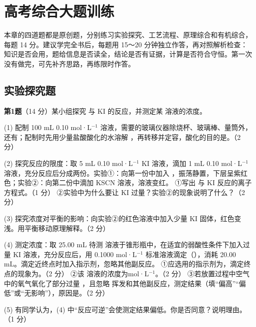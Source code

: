 \chapter{高考综合大题训练}

本章的四道题都是原创题，分别练习实验探究、工艺流程、原理综合和有机综合，每题 14 分。建议学完全书后，每题用 15～20 分钟独立作答，再对照解析检查：知识是否会用，题给信息是否读全，结论是否有证据，计算是否符合守恒。第一次没有做完，可先补齐思路，再练限时作答。

\section{实验探究题}
\noindent\textbf{第1题}（14 分）某小组探究  与 KI 的反应，并测定某  溶液的浓度。

(1) 配制 100 mL 0.10 mol·L$^{-1}$  溶液，需要的玻璃仪器除烧杯、玻璃棒、量筒外，还有\tk；配制时先用少量盐酸酸化的水溶解 ，再转移并定容，酸化的目的是\tk。（2 分）

(2) 探究反应的限度：取 5 mL 0.10 mol·L$^{-1}$ KI 溶液，滴加 1 mL 0.10 mol·L$^{-1}$  溶液，充分反应后分成两份。实验①：向第一份中加入 ，振荡静置，下层呈紫红色；实验②：向第二份中滴加 KSCN 溶液，溶液变红。
\quad ①写出  与 KI 反应的离子方程式。（1 分）
\quad ②实验中为什么要让 KI 过量？实验②的现象说明了什么？（2 分）

(3) 探究浓度对平衡的影响：向实验②的红色溶液中加入少量 KI 固体，红色变浅。用平衡移动原理解释。（2 分）

(4) 测定浓度：取 25.00 mL 待测  溶液于锥形瓶中，在适宜的弱酸性条件下加入过量 KI 溶液，充分反应后，用 0.1000 mol·L$^{-1}$  标准溶液滴定（），消耗 20.00 mL。滴定近终点时加入指示剂，忽略其他副反应。
\quad ①应选用的指示剂为\tk，滴定终点的现象为\tk。（2 分）
\quad ②该  溶液的浓度为\tk mol·L$^{-1}$。（2 分）
\quad ③若放置过程中空气中的氧气氧化了部分过量 ，且忽略  挥发和其他副反应，测定结果\tk（填“偏高”“偏低”或“无影响”），原因是\tk。（2 分）

(5) 有同学认为，(4) 中“反应可逆”会使测定结果偏低。你是否同意？说明理由。（1 分）

